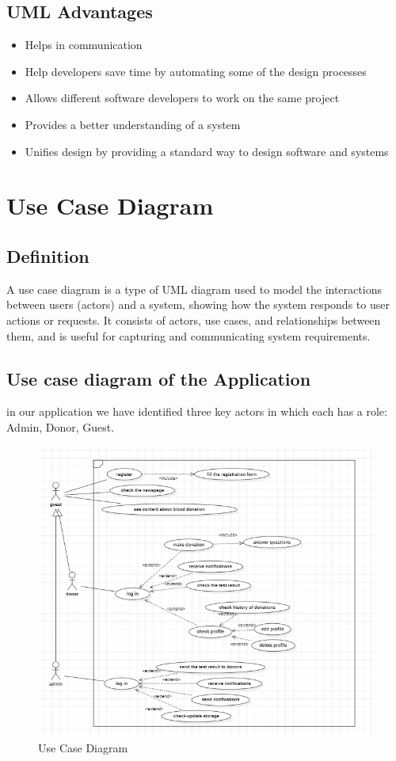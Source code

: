 \subsection{UML Advantages}

\begin{itemize}
\item  Helps in communication
\item   Help developers save time by automating some of the design processes
\item Allows different software developers to work on the same project
\item  Provides a better understanding of a system
\item  Unifies design by providing a standard way to design software and systems
\end{itemize}


\section{Use Case Diagram}
\subsection{Definition}
A use case diagram is a type of UML diagram used to model the interactions between users (actors) and a system, showing how the system responds to user actions or requests. It consists of actors, use cases, and relationships between them, and is useful for capturing and communicating system requirements.

\subsection{Use case diagram of the Application}

in our application we have identified three key actors in which each has a role: Admin, Donor, Guest.

\begin{figure}[H]
    \centering
    \includegraphics[width=1\textwidth]{images/use.png}
    \caption{Use Case Diagram}
    \label{fig:figure4}
\end{figure}



